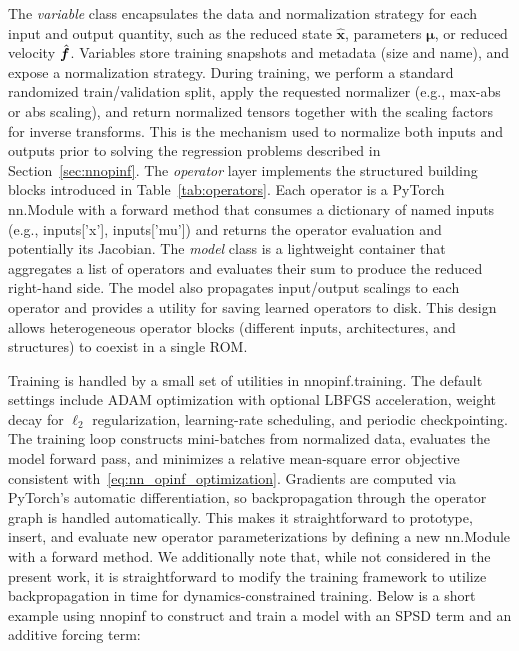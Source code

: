 \documentclass[3p,computermodern,11pt]{elsarticle}
\numberwithin{equation}{section}
\newcommand{\code}[1]{{\ttfamily\color{black} #1}}
\newcommand{\reducedState}{\hat{\state}}
\newcommand{\reducedVelocity}{\skew{4}\hat{\velocity}}
\newcommand{\state}{\boldsymbol x}
\newcommand{\velocity}{\boldsymbol f}
\newcommand{\params}{\boldsymbol \mu}
\begin{document}
The \emph{variable} class encapsulates the data and normalization strategy for each input and output quantity, such as the reduced state $\reducedState$, parameters $\params$, or reduced velocity $\reducedVelocity$. Variables store training snapshots and metadata (size and name), and expose a normalization strategy. During training, we perform a standard randomized train/validation split, apply the requested normalizer (e.g., max-abs or abs scaling), and return normalized tensors together with the scaling factors for inverse transforms. This is the mechanism used to normalize both inputs and outputs prior to solving the regression problems described in Section~\ref{sec:nnopinf}.
The \emph{operator} layer implements the structured building blocks introduced in Table~\ref{tab:operators}. Each operator is a PyTorch \code{nn.Module} with a \code{forward} method that consumes a dictionary of named inputs (e.g., \code{inputs['x']}, \code{inputs['mu']}) and returns the operator evaluation and potentially its Jacobian. 
The \emph{model} class is a lightweight container that aggregates a list of operators and evaluates their sum to produce the reduced right-hand side. The model also propagates input/output scalings to each operator and provides a utility for saving learned operators to disk. This design allows heterogeneous operator blocks (different inputs, architectures, and structures) to coexist in a single ROM.

Training is handled by a small set of utilities in \code{nnopinf.training}. The default settings include ADAM optimization with optional LBFGS acceleration, weight decay for $\ell_2$ regularization, learning-rate scheduling, and periodic checkpointing. The training loop constructs mini-batches from normalized data, evaluates the model forward pass, and minimizes a relative mean-square error objective consistent with~\eqref{eq:nn_opinf_optimization}. Gradients are computed via PyTorch's automatic differentiation, so backpropagation through the operator graph is handled automatically. This makes it straightforward to prototype, insert, and evaluate new operator parameterizations by defining a new \code{nn.Module} with a \code{forward} method. We additionally note that, while not considered in the present work, it is straightforward to modify the training framework to utilize backpropagation in time for dynamics-constrained training. Below is a short example using \code{nnopinf} to construct and train a model with an SPSD term and an additive forcing term:
\end{document}
